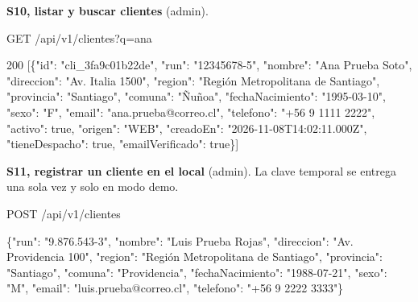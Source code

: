 \textbf{S10, listar y buscar clientes} (admin).


\begin{codigo}
GET /\allowbreak{}api/\allowbreak{}v1/\allowbreak{}clientes?\allowbreak{}q=\allowbreak{}ana\par
\end{codigo}

\begin{codigo}
200 [\allowbreak{}\{"id":\allowbreak{} "cli\_\allowbreak{}3fa9c01b22de",\allowbreak{} "run":\allowbreak{} "12345678-\allowbreak{}5",\allowbreak{} "nombre":\allowbreak{} "Ana Prueba Soto",\allowbreak{} "direccion":\allowbreak{} "Av.\allowbreak{} Italia 1500",\allowbreak{} "region":\allowbreak{} "Región Metropolitana de Santiago",\allowbreak{} "provincia":\allowbreak{} "Santiago",\allowbreak{} "comuna":\allowbreak{} "Ñuñoa",\allowbreak{} "fechaNacimiento":\allowbreak{} "1995-\allowbreak{}03-\allowbreak{}10",\allowbreak{} "sexo":\allowbreak{} "F",\allowbreak{} "email":\allowbreak{} "ana.\allowbreak{}prueba@correo.\allowbreak{}cl",\allowbreak{} "telefono":\allowbreak{} "+56 9 1111 2222",\allowbreak{} "activo":\allowbreak{} true,\allowbreak{} "origen":\allowbreak{} "WEB",\allowbreak{} "creadoEn":\allowbreak{} "2026-\allowbreak{}11-\allowbreak{}08T14:\allowbreak{}02:\allowbreak{}11.\allowbreak{}000Z",\allowbreak{} "tieneDespacho":\allowbreak{} true,\allowbreak{} "emailVerificado":\allowbreak{} true\}]\par
\end{codigo}

\textbf{S11, registrar un cliente en el local} (admin). La clave temporal se entrega una sola vez y solo en modo demo.


\begin{codigo}
POST /\allowbreak{}api/\allowbreak{}v1/\allowbreak{}clientes\par
\{"run":\allowbreak{} "9.\allowbreak{}876.\allowbreak{}543-\allowbreak{}3",\allowbreak{} "nombre":\allowbreak{} "Luis Prueba Rojas",\allowbreak{} "direccion":\allowbreak{} "Av.\allowbreak{} Providencia 100",\allowbreak{} "region":\allowbreak{} "Región Metropolitana de Santiago",\allowbreak{} "provincia":\allowbreak{} "Santiago",\allowbreak{} "comuna":\allowbreak{} "Providencia",\allowbreak{} "fechaNacimiento":\allowbreak{} "1988-\allowbreak{}07-\allowbreak{}21",\allowbreak{} "sexo":\allowbreak{} "M",\allowbreak{} "email":\allowbreak{} "luis.\allowbreak{}prueba@correo.\allowbreak{}cl",\allowbreak{} "telefono":\allowbreak{} "+56 9 2222 3333"\}\par
\end{codigo}

